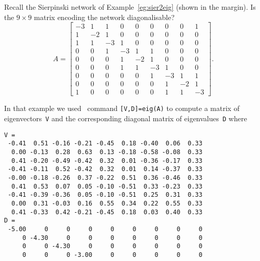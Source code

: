 \begin{example} \label{eg:sier2eigp}
Recall the Sierpinski network of Example~\ref{eg:sier2eig} (shown in the margin).
Is the \(9\times9\) matrix encoding the network diagonalisable?
%
\begin{equation*}
A=\begin{bmatrix}-3&1&1&0&0&0&0&0&1
\\1&-2&1&0&0&0&0&0&0
\\1&1&-3&1&0&0&0&0&0
\\0&0&1&-3&1&1&0&0&0
\\0&0&0&1&-2&1&0&0&0
\\0&0&0&1&1&-3&1&0&0
\\0&0&0&0&0&1&-3&1&1
\\0&0&0&0&0&0&1&-2&1
\\1&0&0&0&0&0&1&1&-3 \end{bmatrix}.
\end{equation*}
\begin{solution} 
In that example we used \script\ command \verb|[V,D]=eig(A)| to compute a matrix of eigenvectors~\verb|V| and the corresponding diagonal matrix of eigenvalues~\verb|D| where \twodp
{\small%
\begin{verbatim}
V =
 -0.41  0.51 -0.16 -0.21 -0.45  0.18 -0.40  0.06  0.33
  0.00 -0.13  0.28  0.63  0.13 -0.18 -0.58 -0.08  0.33
  0.41 -0.20 -0.49 -0.42  0.32  0.01 -0.36 -0.17  0.33
 -0.41 -0.11  0.52 -0.42  0.32  0.01  0.14 -0.37  0.33
 -0.00 -0.18 -0.26  0.37 -0.22  0.51  0.36 -0.46  0.33
  0.41  0.53  0.07  0.05 -0.10 -0.51  0.33 -0.23  0.33
 -0.41 -0.39 -0.36  0.05 -0.10 -0.51  0.25  0.31  0.33
  0.00  0.31 -0.03  0.16  0.55  0.34  0.22  0.55  0.33
  0.41 -0.33  0.42 -0.21 -0.45  0.18  0.03  0.40  0.33
D =
 -5.00     0     0     0     0     0     0     0     0
     0 -4.30     0     0     0     0     0     0     0
     0     0 -4.30     0     0     0     0     0     0
     0     0     0 -3.00     0     0     0     0     0

\end{verbatim}}
\end{solution}
\end{example}
